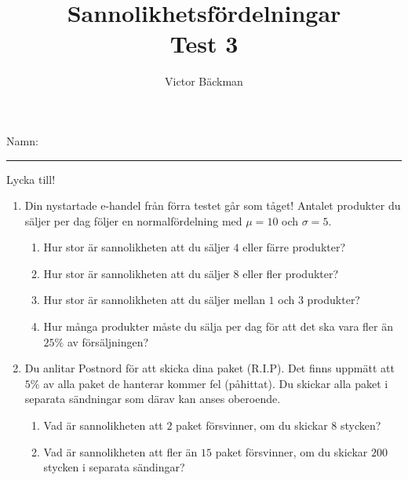 \documentclass[a4paper,10pt]{article}
\title{Sannolikhetsfördelningar \\ {\large Test 3}}
\author{Victor Bäckman}
\begin{document}
\maketitle
\vspace{2cm}
Namn:
{\rule{13cm}{0.4pt}}
\vspace{8cm}
\begin{center}
  {\huge Lycka till!}
\end{center}
\newpage
\begin{enumerate}
  \item{Din nystartade e-handel från förra testet går som tåget! Antalet produkter du säljer per dag följer en normalfördelning med $\mu = 10$ och $\sigma=5$.}
    \begin{enumerate}
      \item{Hur stor är sannolikheten att du säljer $4$ eller färre produkter?}
      \vspace{8cm}
      \item{Hur stor är sannolikheten att du säljer $8$ eller fler produkter?}
      \newpage
      \item{Hur stor är sannolikheten att du säljer mellan $1$ och $3$ produkter?}
      \vspace{6cm}
      \item{Hur många produkter måste du sälja per dag för att det ska vara fler än $25\%$ av försäljningen?}
    \end{enumerate}
    \newpage
  \item{Du anlitar Postnord för att skicka dina paket (R.I.P). Det finns uppmätt att $5\%$ av alla paket de hanterar kommer fel (påhittat). Du skickar alla paket i separata sändningar som därav kan anses oberoende.}
    \begin{enumerate}
        \item{Vad är sannolikheten att $2$ paket försvinner, om du skickar $8$ stycken?}
        \vspace{8cm}
        \item{Vad är sannolikheten att fler än $15$ paket försvinner, om du skickar $200$ stycken i separata sändingar?}
    \end{enumerate}
\end{enumerate}
\vfill
\end{document}

